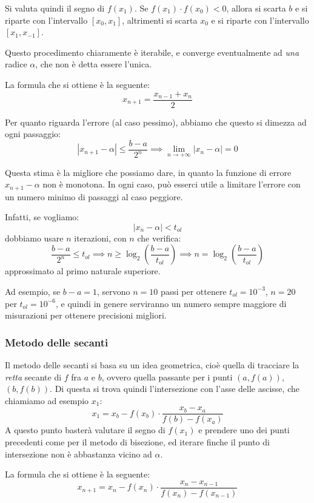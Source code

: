 \documentclass[a4paper,11pt]{article}
\begin{document}
Si valuta quindi il segno di $f(x_1)$.
Se $f(x_1) \cdot f(x_0) < 0$, allora si scarta $b$ e si riparte con l'intervallo $[x_0, x_1]$, altrimenti si scarta $x_0$ e si riparte con l'intervallo $[x_1, x_{-1}]$.

Questo procedimento chiaramente è iterabile, e converge eventualmente ad \textit{una} radice $\alpha$, che non è detta essere l'unica.

La formula che si ottiene è la seguente:
$$
x_{n + 1} = \frac{x_{n - 1} + x_n}{2} 
$$

Per quanto riguarda l'errore (al caso pessimo), abbiamo che questo si dimezza ad ogni passaggio:
$$
| x_{n + 1} - \alpha| \leq \frac{b - a}{2^n} \implies \lim_{n \rightarrow +\infty} |x_n - \alpha| = 0
$$

Questa stima è la migliore che possiamo dare, in quanto la funzione di errore $x_{n + 1} - \alpha$ non è monotona.
In ogni caso, può esserci utile a limitare l'errore con un numero minimo di passaggi al caso peggiore.

Infatti, se vogliamo:
$$
|x_n - \alpha| < t_{ol}
$$
dobbiamo usare $n$ iterazioni, con $n$ che verifica:
$$
\frac{b - a}{2^n} \leq t_{ol} \implies n \geq \log_2 \left( \frac{b - a}{t_{ol}} \right) \implies n = \log_2 \left( \frac{b - a}{t_{ol}} \right)
$$
approssimato al primo naturale superiore.

Ad esempio, se $b - a = 1$, servono $n = 10$ passi per ottenere $t_{ol} = 10^{-3}$, $n = 20$ per $t_{ol} = 10^{-6}$, e quindi in genere serviranno un numero sempre maggiore di misurazioni per ottenere precisioni migliori.

\subsubsection{Metodo delle secanti}
Il metodo delle secanti si basa su un idea geometrica, cioè quella di tracciare la \textit{retta} secante di $f$ fra $a$ e $b$, ovvero quella passante per i punti $(a, f(a))$, $(b, f(b))$.
Di questa si trova quindi l'intersezione con l'asse delle ascisse, che chiamiamo ad esempio $x_1$:
$$
x_1 = x_b - f(x_b) \cdot \frac{x_b - x_a}{f(b) - f(x_{a})}
$$
A questo punto basterà valutare il segno di $f(x_1)$ e prendere uno dei punti precedenti come per il metodo di bisezione, ed iterare finche il punto di intersezione non è abbastanza vicino ad $\alpha$.

La formula che si ottiene è la seguente:
$$
x_{n + 1} = x_n - f(x_n) \cdot \frac{x_n - x_{n - 1}}{f(x_n) - f(x_{n - 1})}
$$
\end{document}

